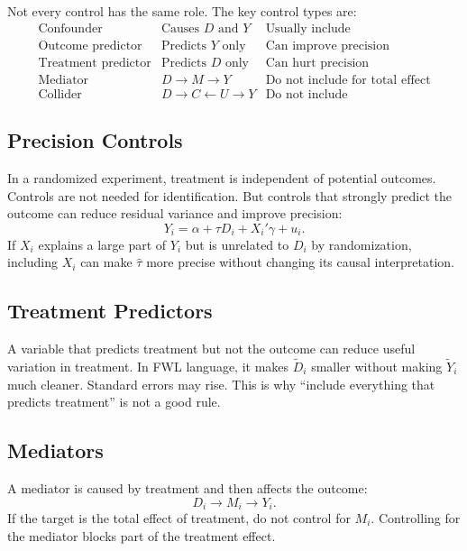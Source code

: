Not every control has the same role. The key control types are:
\[
\begin{array}{lll}
\text{Confounder} & \text{Causes } D \text{ and } Y & \text{Usually include} \\
\text{Outcome predictor} & \text{Predicts } Y \text{ only} & \text{Can improve precision} \\
\text{Treatment predictor} & \text{Predicts } D \text{ only} & \text{Can hurt precision} \\
\text{Mediator} & D \rightarrow M \rightarrow Y & \text{Do not include for total effect} \\
\text{Collider} & D \rightarrow C \leftarrow U \rightarrow Y & \text{Do not include}
\end{array}
\]

\subsection{Precision Controls}

In a randomized experiment, treatment is independent of potential outcomes.
Controls are not needed for identification. But controls that strongly predict
the outcome can reduce residual variance and improve precision:
\[
  Y_i=\alpha+\tau D_i+X_i'\gamma+u_i.
\]
If $X_i$ explains a large part of $Y_i$ but is unrelated to $D_i$ by
randomization, including $X_i$ can make $\hat\tau$ more precise without
changing its causal interpretation.

\subsection{Treatment Predictors}

A variable that predicts treatment but not the outcome can reduce useful
variation in treatment. In FWL language, it makes $\tilde D_i$ smaller without
making $\tilde Y_i$ much cleaner. Standard errors may rise. This is why
``include everything that predicts treatment'' is not a good rule.

\subsection{Mediators}

A mediator is caused by treatment and then affects the outcome:
\[
  D_i \rightarrow M_i \rightarrow Y_i.
\]
If the target is the total effect of treatment, do not control for $M_i$.
Controlling for the mediator blocks part of the treatment effect.

